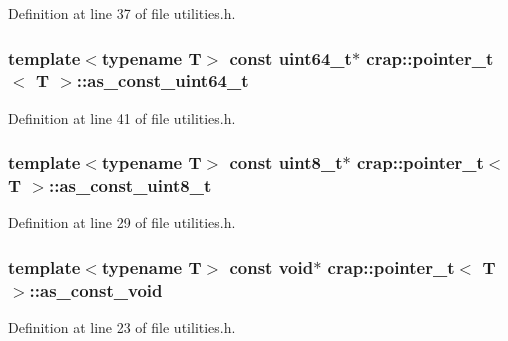 Definition at line 37 of file utilities.\+h.

\hypertarget{structcrap_1_1pointer__t_a72c063a43850807a483d3d91f08b6ebd}{
\subsubsection[{as\+\_\+const\+\_\+uint64\+\_\+t}]{\setlength{\rightskip}{0pt plus 5cm}template$<$typename T$>$ const uint64\+\_\+t$\ast$ {\bf crap\+::pointer\+\_\+t}$<$ T $>$\+::as\+\_\+const\+\_\+uint64\+\_\+t}}\label{structcrap_1_1pointer__t_a72c063a43850807a483d3d91f08b6ebd}


Definition at line 41 of file utilities.\+h.

\hypertarget{structcrap_1_1pointer__t_a9501aed2048dbef966d66362b39bc3fe}{
\subsubsection[{as\+\_\+const\+\_\+uint8\+\_\+t}]{\setlength{\rightskip}{0pt plus 5cm}template$<$typename T$>$ const uint8\+\_\+t$\ast$ {\bf crap\+::pointer\+\_\+t}$<$ T $>$\+::as\+\_\+const\+\_\+uint8\+\_\+t}}\label{structcrap_1_1pointer__t_a9501aed2048dbef966d66362b39bc3fe}


Definition at line 29 of file utilities.\+h.

\hypertarget{structcrap_1_1pointer__t_a76da0338043bbfc7ed947f18ae843d52}{
\subsubsection[{as\+\_\+const\+\_\+void}]{\setlength{\rightskip}{0pt plus 5cm}template$<$typename T$>$ const void$\ast$ {\bf crap\+::pointer\+\_\+t}$<$ T $>$\+::as\+\_\+const\+\_\+void}}\label{structcrap_1_1pointer__t_a76da0338043bbfc7ed947f18ae843d52}


Definition at line 23 of file utilities.\+h.

